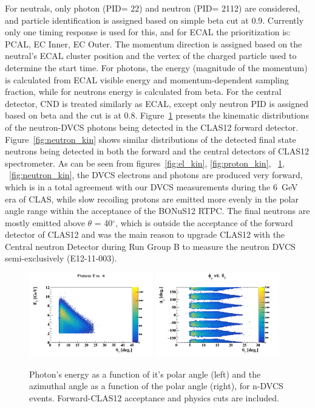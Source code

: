For neutrals, only photon (PID= 22) and neutron (PID= 2112) are considered, and 
particle identification is assigned based on simple beta cut at 0.9. Currently 
only one timing response is used for this, and for ECAL the prioritization is: 
PCAL, EC Inner, EC Outer. The momentum direction is assigned based on the 
neutral's ECAL cluster position and the vertex of the charged particle used to 
determine the start time. For photons, the energy (magnitude of the momentum) 
is calculated from ECAL visible energy and momentum-dependent sampling 
fraction, while for neutrons energy is calculated from beta. For the central 
detector, CND is treated similarly as ECAL, except only neutron PID is assigned 
based on beta and the cut is at 0.8. Figure~\ref{fig:photon_kin} presents the 
kinematic distributions of the neutron-DVCS photons being detected in the 
CLAS12 forward detector. Figure~\ref{fig:neutron_kin} shows similar 
distributions of the detected final state neutrons being detected in both the 
forward and the central detectors of CLAS12 spectrometer. As can be seen from 
figures~\ref{fig:el_kin}, \ref{fig:proton_kin}, ~\ref{fig:photon_kin}, 
~\ref{fig:neutron_kin}, the DVCS electrons and photons are produced very 
forward, which is in a total agreement with our DVCS measurements during the 
6~GeV era of CLAS, while slow recoiling protons are emitted more evenly in the 
polar angle range within the acceptance of the BONuS12 RTPC. The final neutrons 
are mostly emitted above $\theta$ = 40$^{\circ}$, which is outside the 
acceptance of the forward detector of CLAS12 and was the main reason to upgrade 
CLAS12 with the Central neutron Detector during Run Group B to measure the 
neutron DVCS semi-exclusively (E12-11-003).  


\begin{figure}[htb]
\centering
   \includegraphics[width=0.48\textwidth,clip,trim=0mm 0mm 0mm 
   20mm]{figs/gamma_E_theta.png}
\includegraphics[width=0.48\textwidth,clip,trim=0mm 0mm 0mm 
   20mm]{figs/gamma_phi_theta.png}
   \caption{Photon's energy as a function of it's polar angle (left) and the 
   azimuthal angle as a function of the polar angle (right), for n-DVCS events.  
   Forward-CLAS12 acceptance and physics cuts are included.}
   \label{fig:photon_kin}
\end{figure}
 

